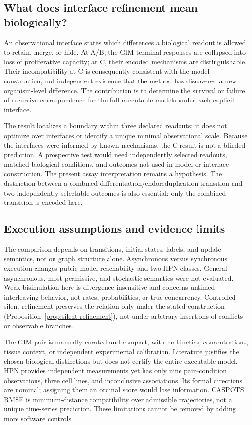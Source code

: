 \documentclass{ws-jbcb}
\numberwithin{equation}{section}
\begin{document}
\subsection{What does interface refinement mean biologically?}
An observational interface states which differences a biological readout is
allowed to retain, merge, or hide. At A/B, the GIM terminal responses are
collapsed into loss of proliferative capacity; at C, their encoded mechanisms
are distinguishable. Their incompatibility at C is consequently consistent
with the model construction, not independent evidence that the method has
discovered a new organism-level difference. The contribution is to determine
the survival or failure of recursive correspondence for the full executable
models under each explicit interface.

The result localizes a boundary within three declared readouts; it does not
optimize over interfaces or identify a unique minimal observational scale.
Because the interfaces were informed by known mechanisms, the C result is not
a blinded prediction. A prospective test would need independently selected
readouts, matched biological conditions, and outcomes not used in model or
interface construction. The present assay interpretation remains a hypothesis.
The distinction between a combined differentiation/endoreduplication transition
and two independently selectable outcomes is also essential: only the combined
transition is encoded here.

\subsection{Execution assumptions and evidence limits}
The comparison depends on transitions, initial states, labels, and update
semantics, not on graph structure alone. Asynchronous versus synchronous
execution changes public-model reachability and two HPN classes. General
asynchronous, most-permissive, and stochastic semantics were not evaluated.
\cite{Pauleve2020} Weak bisimulation here is divergence-insensitive and concerns
untimed interleaving behavior, not rates, probabilities, or true concurrency.
Controlled silent refinement preserves the relation only under the stated
construction (Proposition~\ref{prop:silent-refinement}), not under arbitrary
insertions of conflicts or observable branches.

The GIM pair is manually curated and compact, with no kinetics, concentrations,
tissue context, or independent experimental calibration. Literature justifies
the chosen biological distinctions but does not certify the entire executable
model. HPN provides independent measurements yet has only nine pair--condition
observations, three cell lines, and inconclusive associations. Its formal
directions are nominal; assigning them an ordinal score would lose information.
CASPOTS RMSE is minimum-distance compatibility over admissible trajectories,
not a unique time-series prediction. These limitations cannot be removed by
adding more software controls.
\end{document}

